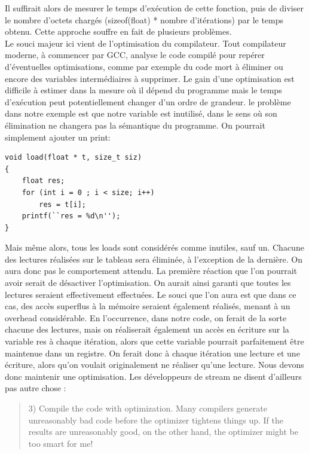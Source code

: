 \documentclass{report}
\begin{document}
Il suffirait alors de mesurer le temps d'exécution de cette fonction, puis de diviser le nombre d'octets
chargés (sizeof(float) * nombre d'itérations) par le temps obtenu.  Cette approche souffre en fait de 
plusieurs problèmes.
\\Le souci majeur ici vient de l'optimisation du compilateur. Tout compilateur moderne, à commencer
par GCC, analyse le code compilé pour repérer d'éventuelles optimisations, comme par exemple du 
code mort à éliminer ou encore des variables intermédiaires à supprimer. Le gain d'une optimisation
est difficile à estimer dans la mesure où il dépend du programme mais le temps d'exécution peut
potentiellement changer d'un ordre de grandeur. le problème dans notre exemple est que notre variable
est inutilisé, dans le sens où son élimination ne changera pas la sémantique du programme. On pourrait
simplement ajouter un print:
\begin{lstlisting}
void load(float * t, size_t siz)
{
    float res;
    for (int i = 0 ; i < size; i++)
        res = t[i]; 
    printf(``res = %d\n''); 
}
\end{lstlisting}

Mais même alors, tous les loads sont considérés comme inutiles, sauf un. Chacune des lectures réalisées
sur le tableau sera éliminée, à l'exception de la dernière. On aura donc pas le comportement attendu.
La première réaction que l'on pourrait avoir serait de désactiver l'optimisation. On aurait ainsi 
garanti que toutes les lectures seraient effectivement effectuées. Le souci que l'on aura est que dans
ce cas, des accès superflus à la mémoire seraient également réalisés, menant à un overhead considérable.
En l'occurrence, dans notre code, on ferait de la sorte chacune des lectures, mais on réaliserait 
également un accès en écriture sur la variable res à chaque itération, alors que cette variable pourrait
parfaitement être maintenue dans un registre. On ferait donc à chaque itération une lecture et une
écriture, alors qu'on voulait originalement ne réaliser qu'une lecture. Nous devons donc maintenir
une optimisation. Les développeurs de stream ne disent d'ailleurs pas autre chose :

\begin{quote}
 	3) Compile the code with optimization.  Many compilers generate
        unreasonably bad code before the optimizer tightens things up.  
      If the results are unreasonably good, on the other hand, the
        optimizer might be too smart for me!
\end{quote}
\end{document}
